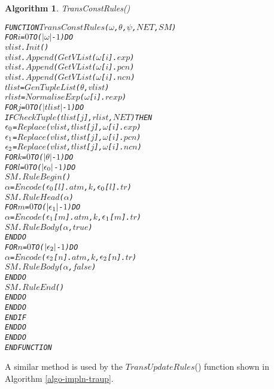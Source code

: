 \documentclass[11pt]{report}
\newenvironment{vverbatim}
{
  \begin{alltt}
}
{
    \vspace{-\baselineskip}
  \end{alltt}
}
\newtheorem{vvalgorithm}{Algorithm}[chapter]
\newenvironment{valgorithm}[2]
{
  \begin{vvalgorithm}{#1}
    \label{#2}
    \small
    \begin{vverbatim}
}
{
    \end{vverbatim}
  \end{vvalgorithm}
}
\begin{document}
          \begin{valgorithm}{TransConstRules()}{algo-impln-traco}
FUNCTION \(TransConstRules\)(\(\omega\), \(\theta\), \(\psi\), \(NET\), \(SM\))
  FOR \(i\) = \(0\) TO (\(|\omega|\) - \(1\)) DO
    \(vlist\).\(Init\)()
    \(vlist\).\(Append\)(\(GetVList\)(\(\omega\)[\(i\)].\(exp\))
    \(vlist\).\(Append\)(\(GetVList\)(\(\omega\)[\(i\)].\(pcn\))
    \(vlist\).\(Append\)(\(GetVList\)(\(\omega\)[\(i\)].\(ncn\))
    \(tlist\) = \(GenTupleList\)(\(\theta\), \(vlist\))
    \(rlist\) = \(NormaliseExp\)(\(\omega\)[\(i\)].\(rexp\))
    FOR \(j\) = \(0\) TO (\(|tlist|\) - \(1\)) DO
      IF \(CheckTuple\)(\(tlist\)[\(j\)], \(rlist\), \(NET\)) THEN
        \(\epsilon\sb{0}\) = \(Replace\)(\(vlist\), \(tlist\)[\(j\)], \(\omega\)[\(i\)].\(exp\))
        \(\epsilon\sb{1}\) = \(Replace\)(\(vlist\), \(tlist\)[\(j\)], \(\omega\)[\(i\)].\(pcn\))
        \(\epsilon\sb{2}\) = \(Replace\)(\(vlist\), \(tlist\)[\(j\)], \(\omega\)[\(i\)].\(ncn\))
        FOR \(k\) = \(0\) TO (\(|\theta|\) - \(1\)) DO
          FOR \(l\) = \(0\) TO (\(|\epsilon\sb{0}|\) - \(1\)) DO
            \(SM\).\(RuleBegin\)()
            \(\alpha\) = \(Encode\)(\(\epsilon\sb{0}\)[\(l\)].\(atm\), \(k\), \(\epsilon\sb{0}\)[\(l\)].\(tr\))
            \(SM\).\(RuleHead\)(\(\alpha\))
            FOR \(m\) = \(0\) TO (\(|\epsilon\sb{1}|\) - \(1\)) DO
              \(\alpha\) = \(Encode\)(\(\epsilon\sb{1}\)[\(m\)].\(atm\), \(k\), \(\epsilon\sb{1}\)[\(m\)].\(tr\))
              \(SM\).\(RuleBody\)(\(\alpha\), \(true\))
            ENDDO
            FOR \(n\) = \(0\) TO (\(|\epsilon\sb{2}|\) - \(1\)) DO
              \(\alpha\) = \(Encode\)(\(\epsilon\sb{2}\)[\(n\)].\(atm\), \(k\), \(\epsilon\sb{2}\)[\(n\)].\(tr\))
              \(SM\).\(RuleBody\)(\(\alpha\), \(false\))
            ENDDO
            \(SM\).\(RuleEnd\)()
          ENDDO
        ENDDO
      ENDIF
    ENDDO
  ENDDO
ENDFUNCTION
          \end{valgorithm}

          A similar method is used by the $TransUpdateRules$() function
          shown in Algorithm \ref{algo-impln-traup}.
\end{document}
